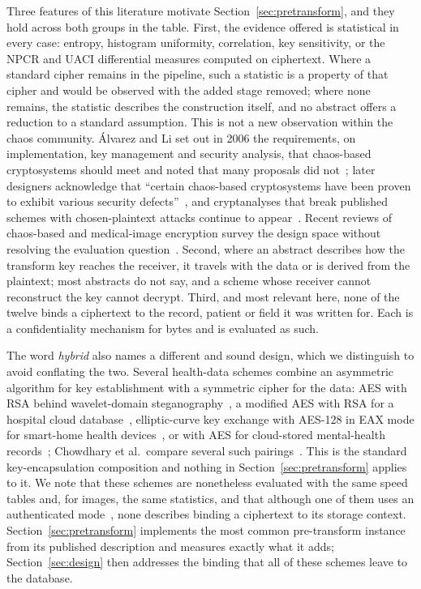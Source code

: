Three features of this literature motivate Section~\ref{sec:pretransform}, and they hold across both groups in the table. First, the evidence offered is statistical in every case: entropy, histogram uniformity, correlation, key sensitivity, or the NPCR and UACI differential measures computed on ciphertext. Where a standard cipher remains in the pipeline, such a statistic is a property of that cipher and would be observed with the added stage removed; where none remains, the statistic describes the construction itself, and no abstract offers a reduction to a standard assumption. This is not a new observation within the chaos community. {\'A}lvarez and Li set out in 2006 the requirements, on implementation, key management and security analysis, that chaos-based cryptosystems should meet and noted that many proposals did not~\cite{alvarez2006requirements}; later designers acknowledge that ``certain chaos-based cryptosystems have been proven to exhibit various security defects''~\cite{hua2019cosine}, and cryptanalyses that break published schemes with chosen-plaintext attacks continue to appear~\cite{feng2021cryptanalysis}. Recent reviews of chaos-based and medical-image encryption survey the design space without resolving the evaluation question~\cite{zhang2023chaosreview,ahmed2023mireview}. Second, where an abstract describes how the transform key reaches the receiver, it travels with the data or is derived from the plaintext; most abstracts do not say, and a scheme whose receiver cannot reconstruct the key cannot decrypt. Third, and most relevant here, none of the twelve binds a ciphertext to the record, patient or field it was written for. Each is a confidentiality mechanism for bytes and is evaluated as such.

The word \emph{hybrid} also names a different and sound design, which we distinguish to avoid conflating the two. Several health-data schemes combine an asymmetric algorithm for key establishment with a symmetric cipher for the data: AES with RSA behind wavelet-domain steganography~\cite{elhoseny2018iot}, a modified AES with RSA for a hospital cloud database~\cite{zhang2019paes}, elliptic-curve key exchange with AES-128 in EAX mode for smart-home health devices~\cite{popoola2024smarthome}, or with AES for cloud-stored mental-health records~\cite{selvi2025symeccipher}; Chowdhary et al.\ compare several such pairings~\cite{chowdhary2020hybrid}. This is the standard key-encapsulation composition and nothing in Section~\ref{sec:pretransform} applies to it. We note that these schemes are nonetheless evaluated with the same speed tables and, for images, the same statistics, and that although one of them uses an authenticated mode~\cite{popoola2024smarthome}, none describes binding a ciphertext to its storage context. Section~\ref{sec:pretransform} implements the most common pre-transform instance from its published description and measures exactly what it adds; Section~\ref{sec:design} then addresses the binding that all of these schemes leave to the database.
